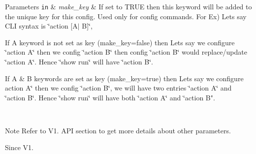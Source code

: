 \begin{DoxyParams}[1]{Parameters}
\mbox{\tt in}  & {\em make\+\_\+key} & If set to T\+R\+UE then this keyword will be added to the unique key for this config. Used only for config commands. For Ex) Lets say C\+LI syntax is \char`\"{}action \mbox{[}\+A$\vert$ B\mbox{]}\char`\"{},
\begin{DoxyItemize}
\item If A keyword is not set as key (make\+\_\+key=false) then Lets say we configure \char`\"{}action A\char`\"{} then we config \char`\"{}action B\char`\"{} then config \char`\"{}action B\char`\"{} would replace/update \char`\"{}action A\char`\"{}. Hence \char`\"{}show run\char`\"{} will have \char`\"{}action B\char`\"{}.
\item If A \& B keywords are set as key (make\+\_\+key=true) then Lets say we configure action A\char`\"{} then we config \char`\"{}action B\char`\"{}, we will
                    have two entries \char`\"{}action A\char`\"{} and \char`\"{}action B\char`\"{}. Hence \char`\"{}show run\char`\"{}
                    will have both \char`\"{}action A\char`\"{} and \char`\"{}action B".
\end{DoxyItemize}\\
\hline
\end{DoxyParams}
\begin{DoxyNote}{Note}
Refer to V1. A\+PI section to get more details about other parameters.
\end{DoxyNote}
\begin{DoxySince}{Since}
V1. 
\end{DoxySince}
\mbox{\label{classnxos_1_1_nx_cli_cmd_abc9244b0bcf22142b5d784c06a6aa91b}} 
